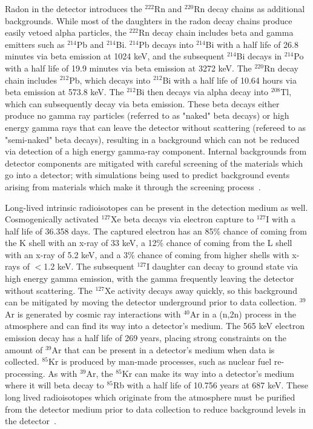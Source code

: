 Radon in the detector introduces the $^{222}$Rn and $^{220}$Rn decay chains as additional backgrounds. While most of the daughters in the radon decay chains produce easily vetoed alpha particles, the $^{222}$Rn decay chain includes beta and gamma emitters such as $^{214}$Pb and $^{214}$Bi.  $^{214}$Pb decays into $^{214}$Bi with a half life of 26.8 minutes via beta emission at 1024 keV, and the subsequent $^{214}$Bi decays in $^{214}$Po with a half life of 19.9 minutes via beta emission at 3272 keV.  The $^{220}$Rn decay chain includes $^{212}$Pb, which decays into $^{212}$Bi with a half life of 10.64 hours via beta emission at 573.8 keV.  The $^{212}$Bi then decays via alpha decay into $^{208}$Tl, which can subsequently decay via beta emission.  These beta decays either produce no gamma ray particles (referred to as "naked" beta decays) or high energy gamma rays that can leave the detector without scattering (refereed to as "semi-naked" beta decays), resulting in a background which can not be reduced via detection of a high energy gamma-ray component.  Internal backgrounds from detector components are mitigated with careful screening of the materials which go into a detector; with simulations being used to predict background events arising from materials which make it through the screening process~\cite{PauloThesis}.
	 	
Long-lived intrinsic radioisotopes can be present in the detection medium as well.  Cosmogenically activated $^{127}$Xe beta decays via electron capture to $^{127}$I with a half life of 36.358 days.  The captured electron has an 85\% chance of coming from the K shell with an x-ray of 33 keV, a 12\% chance of coming from the L shell with an x-ray of 5.2 keV, and a 3\% chance of coming from higher shells with x-rays of $<$1.2 keV. The subsequent $^{127}$I daughter can decay to ground state via high energy gamma emission, with the gamma frequently leaving the detector without scattering. The $^{127}$Xe activity decays away quickly, so this background can be mitigated by moving the detector underground prior to data collection. $^{39}$Ar is generated by cosmic ray interactions with $^{40}$Ar in a (n,2n) process in the atmosphere and can find its way into a detector's medium.  The 565 keV electron emission decay has a half life of 269 years, placing strong constraints on the amount of $^{39}$Ar that can be present in a detector's medium when data is collected. $^{85}$Kr is produced by man-made processes, such as nuclear fuel re-processing.  As with $^{39}$Ar, the $^{85}$Kr can make its way into a detector's medium where it will beta decay to $^{85}$Rb with a half life of 10.756 years at 687 keV.  These long lived radioisotopes which originate from the atmosphere must be purified from the detector medium prior to data collection to reduce background levels in the detector~\cite{PauloThesis}.

